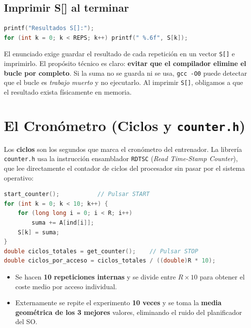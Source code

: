 \documentclass[12pt,a4paper]{article}
\begin{document}
\subsection{Imprimir S[] al terminar}

\begin{lstlisting}[language=C, caption={Impresión de resultados: anti-optimización del compilador}]
printf("Resultados S[]:");
for (int k = 0; k < REPS; k++) printf(" %.6f", S[k]);
\end{lstlisting}

El enunciado exige guardar el resultado de cada repetición en un vector \texttt{S[]} e imprimirlo. El propósito técnico es claro: \textbf{evitar que el compilador elimine el bucle por completo}. Si la suma no se guarda ni se usa, \texttt{gcc -O0} puede detectar que el bucle es \emph{trabajo muerto} y no ejecutarlo. Al imprimir \texttt{S[]}, obligamos a que el resultado exista físicamente en memoria.

\section{El Cronómetro (Ciclos y \texttt{counter.h})}
\label{sec:cronometro}

Los \textbf{ciclos} son los segundos que marca el cronómetro del entrenador. La librería \texttt{counter.h} usa la instrucción ensamblador \texttt{RDTSC} (\emph{Read Time-Stamp Counter}), que lee directamente el contador de ciclos del procesador sin pasar por el sistema operativo:

\begin{lstlisting}[language=C, caption={Estructura de medición con 10 repeticiones internas}]
start_counter();           // Pulsar START
for (int k = 0; k < 10; k++) {
    for (long long i = 0; i < R; i++)
        suma += A[ind[i]];
    S[k] = suma;
}
double ciclos_totales = get_counter();    // Pulsar STOP
double ciclos_por_acceso = ciclos_totales / ((double)R * 10);
\end{lstlisting}

\begin{itemize}[leftmargin=1.5em]
  \item Se hacen \textbf{10 repeticiones internas} y se divide entre $R \times 10$ para obtener el coste medio por acceso individual.
  \item Externamente se repite el experimento \textbf{10 veces} y se toma la \textbf{media geométrica de los 3 mejores} valores, eliminando el ruido del planificador del SO.
\end{itemize}
\end{document}
